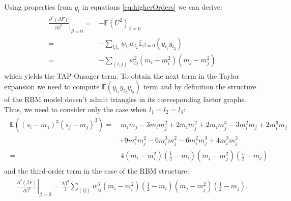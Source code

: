 Using properties from $y_l$ in equations \ref{eq:higherOrders} we can derive:
\begin{align*}
\begin{split}
\left. \frac{\partial^2 (\beta F)}{\partial \beta^2}\right|_{\beta = 0} = & -\mathbb{E}(U^2)_{\beta =0}\\
= & - \sum_{l_i l_2} w_{l_i}w_{l_2} \mathbb{E}_{\beta = 0} (y_{l_1}y_{l_2} ) \\
= & - \sum_{(i,j)} w_{ij}^2 (m_i-m_i^2)(m_j-m_j^2)
\end{split}
\end{align*}
which yields the TAP-Onsager term. 
To obtain the next term in the Taylor expansion we need to compute $\mathbb{E}(y_{l_1} y_{l_2} y_{l_3})$ term and by definition the structure of the RBM model doesn't admit triangles in its corresponding factor graphs. Thus, we need to consider only the case when $l_1 = l_2 = l_3$:
\begin{align}
\begin{split}
\mathbb{E}((s_i-m_1)^3(s_j-m_j)^3)= & ~m_i m_j -3m_i m_j^2 +2 m_i m_j^2 + 2m_im_j^3 -3 m_i^2 m_j 
 + 2 m_i^3 m_j \\
 & + 9 m_i^2m_j^2 - 6m_i^3 m_j^2 - 6 m_i^2 m_j^3 + 4m_i^3m_j^3 
 \\
  = &~ 4(m_i - m_i^2)(\frac{1}{2} - m_i)(m_j - m_j^2)(\frac{1}{2} - m_j)
 \end{split}
\end{align}
and the third-order term in the case of the RBM structure:
\begin{align*}
\begin{split}
\left. \frac{\partial^3 (\beta F)}{\partial \beta^3}\right|_{\beta = 0} = \frac{2\beta^3}{3} \sum_{(ij)} w_{ij}^3 (m_i - m_i^2)(\frac{1}{2} - m_i)(m_j - m_j^2)(\frac{1}{2} - m_j).
\end{split}
\end{align*}


